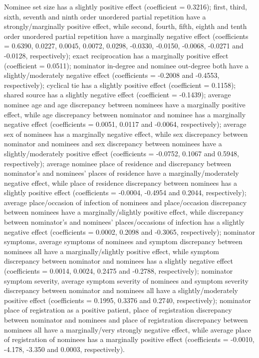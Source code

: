Nominee set size has a slightly positive effect (coefficient = 0.3216); first, third, sixth, seventh and ninth order unordered partial repetition have a strongly/marginally positive effect, while second, fourth, fifth, eighth and tenth order unordered partial repetition have a marginally negative effect (coefficients = 0.6390, 0.0227, 0.0045, 0.0072, 0.0298, -0.0330, -0.0150, -0.0068, -0.0271 and -0.0128, respectively); exact reciprocation has a marginally positive effect (coefficient = 0.0511); nominator in-degree and nominee out-degree both have a slightly/moderately negative effect (coefficients = -0.2008 and -0.4553, respectively); cyclical tie has a slightly positive effect (coefficient = 0.1158); shared source has a slightly negative effect (coefficient = -0.1439); average nominee age and age discrepancy between nominees have a marginally positive effect, while age discrepancy between nominator and nominee has a marginally negative effect (coefficients = 0.0051, 0.0117 and -0.0064, respectively); average sex of nominees has a marginally negative effect, while sex discrepancy between nominator and nominees and sex discrepancy between nominees have a slightly/moderately positive effect (coefficients = -0.0752, 0.1067 and 0.5948, respectively); average nominee place of residence and discrepancy between nominator's and nominees' places of residence have a marginally/moderately negative effect, while place of residence discrepancy between nominees has a slightly positive effect (coefficients = -0.0004, -0.4954 and 0.2044, respectively); average place/occasion of infection of nominees and place/occasion discrepancy between nominees have a marginally/slightly positive effect, while discrepancy between nominator's and nominees' places/occasions of infection has a slightly negative effect (coefficients = 0.0002, 0.2098 and -0.3065, respectively); nominator symptoms, average symptoms of nominees and symptom discrepancy between nominees all have a marginally/slightly positive effect, while symptom discrepancy between nominator and nominees has a slightly negative effect (coefficients = 0.0014, 0.0024, 0.2475 and -0.2788, respectively); nominator symptom severity, average symptom severity of nominees and symptom severity discrepancy between nominator and nominees all have a slightly/moderately positive effect (coefficients = 0.1995, 0.3376 and 0.2740, respectively); nominator place of registration as a positive patient, place of registration discrepancy between nominator and nominees and place of registration discrepancy between nominees all have a marginally/very strongly negative effect, while average place of registration of nominees has a marginally positive effect (coefficients = -0.0010, -4.178, -3.350 and 0.0003, respectively).

